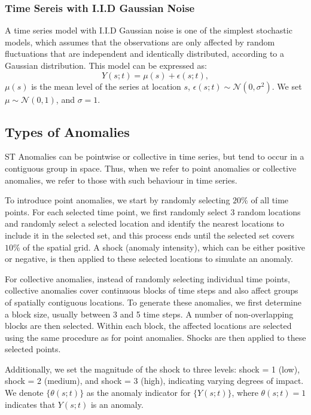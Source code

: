 \documentclass[11pt]{article}
\begin{document}
\subsubsection*{Time Sereis with I.I.D Gaussian Noise}
A time series model with I.I.D Gaussian noise is one of the simplest stochastic models, which assumes that the observations are only affected by random fluctuations that are independent and identically distributed, according to a Gaussian distribution. This model can be expressed as:
\begin{equation}
	Y(s;t) = \mu(s) + \epsilon(s;t),
\end{equation}
$\mu(s)$ is the mean level of the series at location $s$, $\epsilon(s;t) \sim \mathcal{N}(0, \sigma^2)$. We set $\mu\sim \mathcal{N}(0,1)$, and $\sigma=1$.



\subsection{Types of Anomalies}
ST Anomalies can be pointwise or collective in time series, but tend to occur in a contiguous group in space. Thus, when we refer to point anomalies or collective anomalies, we refer to those with such behaviour in time series. 

To introduce point anomalies, we start by randomly selecting $20\%$ of all time points. For each selected time point, we first randomly select 3 random locations and randomly select a selected location and identify the nearest locations to include it in the selected set, and this process ends until the selected set covers $10\%$ of the spatial grid. A shock (anomaly intensity), which can be either positive or negative, is then applied to these selected locations to simulate an anomaly. 


For collective anomalies, instead of randomly selecting individual time points, collective anomalies cover continuous blocks of time steps and also affect groups of spatially contiguous locations. To generate these anomalies, we first determine a block size, usually between 3 and 5 time steps. A number of non-overlapping blocks are then selected. Within each block, the affected locations are selected using the same procedure as for point anomalies. Shocks are then applied to these selected points.

Additionally, we set the magnitude of the shock to three levels: shock = 1 (low), shock = 2 (medium), and shock = 3 (high), indicating varying degrees of impact. We denote $\{\theta(s;t)\}$ as the anomaly indicator for $\{Y(s;t)\}$, where $\theta(s;t) = 1$ indicates that $Y(s;t)$ is an anomaly.
\end{document}

